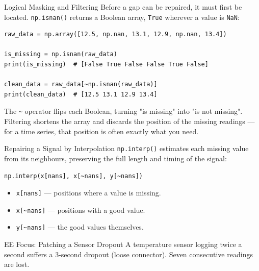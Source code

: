 \documentclass[9pt,aspectratio=169,xcolor=table]{beamer}
\begin{document}
\begin{frame}[fragile]{Logical Masking and Filtering}
    \leavevmode
    Before a gap can be repaired, it must first be \alert{located}.
    \texttt{np.isnan()} returns a Boolean array, \texttt{True} wherever
    a value is \texttt{NaN}:

\begin{lstlisting}
raw_data = np.array([12.5, np.nan, 13.1, 12.9, np.nan, 13.4])

is_missing = np.isnan(raw_data)
print(is_missing)  # [False True False False True False]

clean_data = raw_data[~np.isnan(raw_data)]
print(clean_data)  # [12.5 13.1 12.9 13.4]
\end{lstlisting}

    \vspace{2mm}
    {\small The \texttt{\textasciitilde} operator flips each Boolean,
    turning "is missing" into "is not missing". Filtering shortens the
    array and discards the \alert{position} of the missing readings ---
    for a time series, that position is often exactly what you need.}
\end{frame}

\begin{frame}[fragile]{Repairing a Signal by Interpolation}
    \leavevmode
    \texttt{np.interp()} estimates each missing value from its
    neighbours, preserving the full length and timing of the signal:

\begin{lstlisting}
np.interp(x[nans], x[~nans], y[~nans])
\end{lstlisting}

    \vspace{1mm}
    \begin{itemize}\small
        \item \texttt{x[nans]} --- positions where a value is missing.
        \item \texttt{x[\textasciitilde nans]} --- positions with a
              good value.
        \item \texttt{y[\textasciitilde nans]} --- the good values
              themselves.
    \end{itemize}

    \vspace{2mm}
    \begin{alertblock}{EE Focus: Patching a Sensor Dropout}
        A temperature sensor logging twice a second suffers a
        3-second dropout (loose connector). Seven consecutive readings
        are lost.
    \end{alertblock}
\end{frame}
\end{document}
